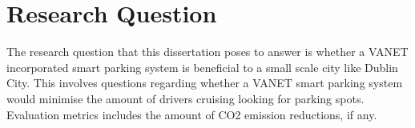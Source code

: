 \section{Research Question}
The research question that this dissertation poses to answer is whether a \ac{VANET} incorporated smart parking system is beneficial to a small scale city like Dublin City. This involves questions regarding whether a \ac{VANET} smart parking system would minimise the amount of drivers cruising looking for parking spots. Evaluation metrics includes the amount of CO2 emission reductions, if any. 